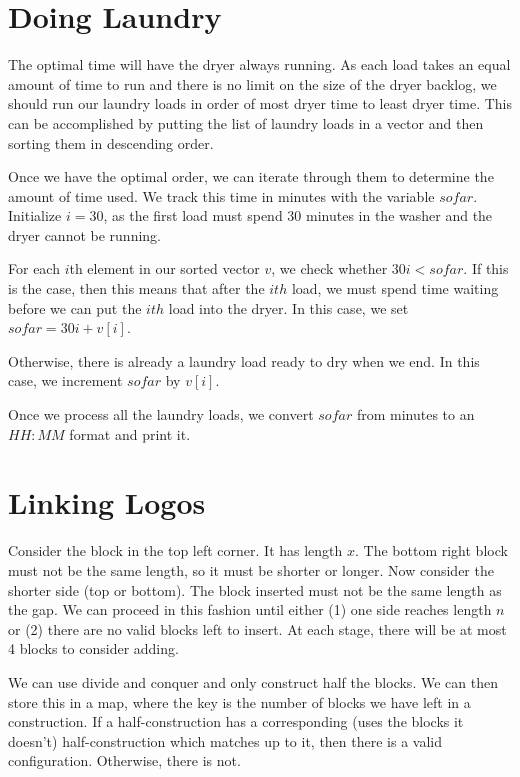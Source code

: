\documentclass{article}
\begin{document}
\section{Doing Laundry}
The optimal time will have the dryer always running. As each load takes an equal amount of time to run and there is no limit on the size of the dryer backlog, we should run our laundry loads in order of most dryer time to least dryer time. This can be accomplished by putting the list of laundry loads in a vector and then sorting them in descending order. 
\par 
Once we have the optimal order, we can iterate through them to determine the amount of time used. We track this time in minutes with the variable $sofar$. Initialize $i=30$, as the first load must spend 30 minutes in the washer and the dryer cannot be running.
\par 
For each $i$th element in our sorted vector $v$, we check whether $30i<sofar$. If this is the case, then this means that after the $ith$ load, we must spend time waiting before we can put the $ith$ load into the dryer. In this case, we set $sofar=30i+v[i]$.
\par 
Otherwise, there is already a laundry load ready to dry when we end. In this case, we increment $sofar$ by $v[i]$.
\par 
Once we process all the laundry loads, we convert $sofar$ from minutes to an $HH:MM$ format and print it.

\section{Linking Logos}
Consider the block in the top left corner. It has length $x$. The bottom right block must not be the same length, so it must be shorter or longer. Now consider the shorter side (top or bottom). The block inserted must not be the same length as the gap. We can proceed in this fashion until either (1) one side reaches length $n$ or (2) there are no valid blocks left to insert. At each stage, there will be at most 4 blocks to consider adding.
\par 
We can use divide and conquer and only construct half the blocks. We can then store this in a map, where the key is the number of blocks we have left in a construction. If a half-construction has a corresponding (uses the blocks it doesn't) half-construction which matches up to it, then there is a valid configuration. Otherwise, there is not.
\end{document}
